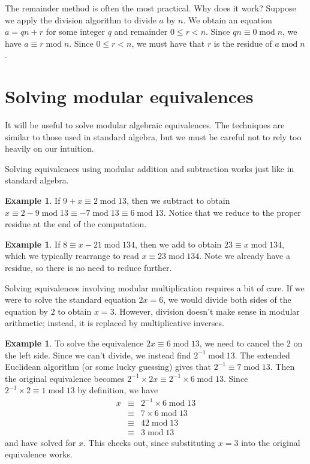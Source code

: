 \documentclass{book}
\theoremstyle{plain}
\theoremstyle{definition}
\newtheorem{example}[theorem]{Example}
\renewcommand{\mod}{\operatorname{mod}}
\renewcommand{\mod}{\operatorname{mod}}
\begin{document}
The remainder method is often the most practical. Why does it work? Suppose we apply the division algorithm to divide $a$ by $n$. We obtain an equation $a = qn + r$ for some integer $q$ and remainder $0 \leq r < n$. Since $qn \equiv 0 \mod n$, we have $a \equiv r \mod n$. Since $0 \leq r < n$, we must have that $r$ is the residue of $a \mod n$.

\section{Solving modular equivalences}
It will be useful to solve modular algebraic equivalences. The techniques are similar to those used in standard algebra, but we must be careful not to rely too heavily on our intuition.

Solving equivalences using modular addition and subtraction works just like in standard algebra.

\begin{example}
If $9 + x \equiv 2 \mod 13$, then we subtract to obtain $x \equiv 2 - 9 \mod 13 \equiv -7 \mod 13 \equiv 6 \mod 13$. Notice that we reduce to the proper residue at the end of the computation.
\end{example}

\begin{example}
If $8 \equiv x - 21 \mod 134$, then we add to obtain $23 \equiv x \mod 134$, which we typically rearrange to read $x \equiv 23 \mod 134$. Note we already have a residue, so there is no need to reduce further.
\end{example}

Solving equivalences involving modular multiplication requires a bit of care. If we were to solve the standard equation $2x = 6$, we would divide both sides of the equation by $2$ to obtain $x = 3$. However, division doesn't make sense in modular arithmetic; instead, it is replaced by multiplicative inverses.

\begin{example}
To solve the equivalence $2x \equiv 6 \mod 13$, we need to cancel the $2$ on the left side. Since we can't divide, we instead find $2^{-1} \mod 13$. The extended Euclidean algorithm (or some lucky guessing) gives that $2^{-1} \equiv 7 \mod 13$. Then the original equivalence becomes $2^{-1} \times 2x \equiv 2^{-1} \times 6 \mod 13$. Since $2^{-1} \times 2 \equiv 1 \mod 13$ by definition, we have
\begin{eqnarray*}
x &\equiv& 2^{-1} \times 6 \mod 13 \\
&\equiv& 7 \times 6 \mod 13 \\
&\equiv& 42 \mod 13 \\
&\equiv& 3 \mod 13
\end{eqnarray*}
and have solved for $x$. This checks out, since substituting $x = 3$ into the original equivalence works.
\end{example}
\end{document}
